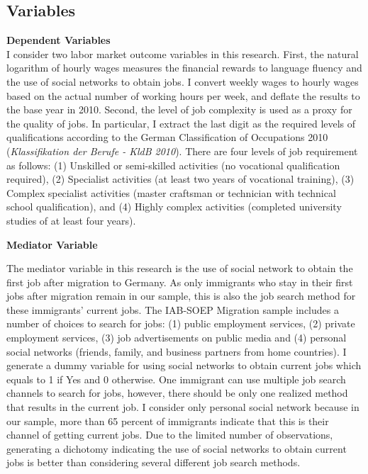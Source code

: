 \documentclass[12pt,a4paper]{article}
\begin{document}

\subsection{Variables}
\textbf{Dependent Variables} \\
I consider two labor market outcome variables in this research. First, the natural logarithm of hourly wages measures the financial rewards to language fluency and the use of social networks to obtain jobs. I convert weekly wages to hourly wages based on the actual number of working hours per week, and deflate the results to the base year in 2010. Second, the level of job complexity is used as a proxy for the quality of jobs. In particular, I extract the last digit as the required levels of qualifications according to the German Classification of Occupations 2010 (\textit{Klassifikation der Berufe - KldB 2010}). There are four levels of job requirement as follows: (1) Unskilled or semi-skilled activities (no vocational qualification required), (2) Specialist activities (at least two years of vocational training), (3) Complex specialist activities (master craftsman or technician with technical school qualification), and (4) Highly complex activities (completed university studies of at least four years). 

\begin{flushleft}
\textbf{Mediator Variable} 
\end{flushleft}

The mediator variable in this research is the use of social network to obtain the first job after migration to Germany. As only immigrants who stay in their first jobs after migration remain in our sample, this is also the job search method for these immigrants' current jobs. The IAB-SOEP Migration sample includes a number of choices to search for jobs: (1) public employment services, (2) private employment services, (3) job advertisements on public media and (4) personal social networks (friends, family, and business partners from home countries). I generate a dummy variable for using social networks to obtain current jobs which equals to 1 if Yes and 0 otherwise. One immigrant can use multiple job search channels to search for jobs, however, there should be only one realized method that results in the current job. I consider only personal social network because in our sample, more than 65 percent of immigrants indicate that this is their channel of getting current jobs. Due to the limited number of observations, generating a dichotomy indicating the use of social networks to obtain current jobs is better than considering several different job search methods. 
\end{document}
